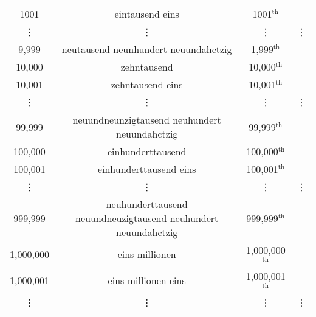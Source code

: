 \begin{tabular}{cccc}
	1001&eintausend eins&1001$^{\text{th}}$&\\
	\vdots&\vdots&\vdots&\vdots\\
	9,999&neutausend neunhundert neuundahctzig&1,999$^{\text{th}}$&\\
	10,000&zehntausend&10,000$^{\text{th}}$&\\
	10,001&zehntausend eins&10,001$^{\text{th}}$&\\
	\vdots&\vdots&\vdots&\vdots\\
	99,999& neuundneunzigtausend neuhundert neuundahctzig&99,999$^{\text{th}}$&\\
	100,000&einhunderttausend&100,000$^{\text{th}}$&\\
	100,001&einhunderttausend eins&100,001$^{\text{th}}$&\\
	\vdots&\vdots&\vdots&\vdots\\
	999,999&neuhunderttausend neuundneuzigtausend neuhundert neuundahctzig&999,999$^{\text{th}}$&\\
	1,000,000&eins millionen&1,000,000$^{\text{th}}$&\\
   1,000,001&eins millionen eins&1,000,001$^{\text{th}}$&\\
	\vdots&\vdots&\vdots&\vdots
\end{tabular}